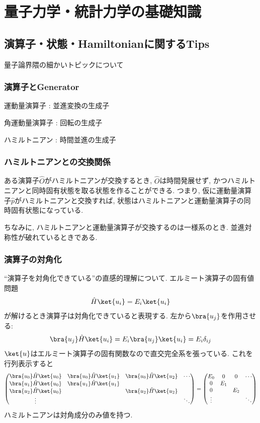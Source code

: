 \documentclass[10.5pt,a4paper]{jreport}
\begin{document}
\chapter{量子力学・統計力学の基礎知識}
\section{演算子・状態・Hamiltonianに関するTips}
量子論界隈の細かいトピックについて
\subsection{演算子とGenerator}
運動量演算子 : 並進変換の生成子

角運動量演算子 : 回転の生成子

ハミルトニアン : 時間並進の生成子
\subsection{ハミルトニアンとの交換関係}
ある演算子$\hat{O}$がハミルトニアンが交換するとき, $\hat{O}$は時間発展せず, かつハミルトニアンと同時固有状態を取る状態を作ることができる. つまり, 仮に運動量演算子$\hat{p}$がハミルトニアンと交換すれば, 状態はハミルトニアンと運動量演算子の同時固有状態になっている.

ちなみに, ハミルトニアンと運動量演算子が交換するのは一様系のとき. 並進対称性が破れているときである. 
\subsection{演算子の対角化}
``演算子を対角化できている''の直感的理解について. エルミート演算子の固有値問題
\begin{eqnarray}
  \hat{H}\ket{u_i} = E_i\ket{u_i}
\end{eqnarray}
が解けるとき演算子は対角化できていると表現する. 左から$\bra{u_j}$を作用させる:
\begin{eqnarray}
  \bra{u_j}\hat{H}\ket{u_i} = E_i\bra{u_j}\ket{u_i} = E_i\delta_{ij}
\end{eqnarray}
$\ket{u}$はエルミート演算子の固有関数なので直交完全系を張っている. これを行列表示すると
\begin{eqnarray}
  \begin{pmatrix}
    \bra{u_0}\hat{H}\ket{u_0}&\bra{u_0}\hat{H}\ket{u_1}&\bra{u_0}\hat{H}\ket{u_2}&\cdots\\
    \bra{u_1}\hat{H}\ket{u_0}&\bra{u_1}\hat{H}\ket{u_1}&&\\
    \bra{u_2}\hat{H}\ket{u_0}&&\bra{u_2}\hat{H}\ket{u_2}&\\
    \vdots&&&\ddots
  \end{pmatrix}
  =
    \begin{pmatrix}
    E_0&0&0&\cdots\\
    0&E_1&&\\
    0&&E_2&\\
    \vdots&&&\ddots
  \end{pmatrix}
\end{eqnarray}
ハミルトニアンは対角成分のみ値を持つ.
\end{document}
